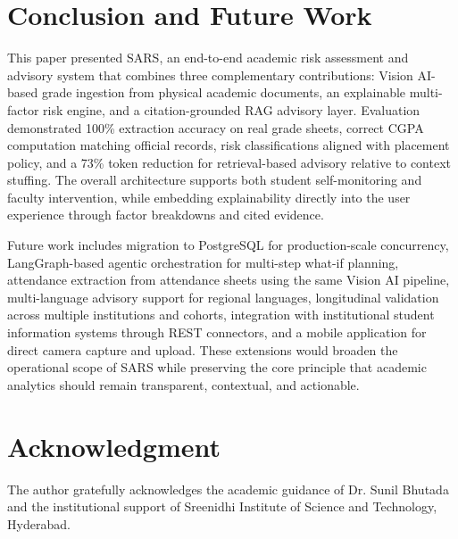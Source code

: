 \documentclass[conference]{IEEEtran}
\begin{document}
\section{Conclusion and Future Work}
This paper presented SARS, an end-to-end academic risk assessment and advisory system that combines three complementary contributions: Vision AI-based grade ingestion from physical academic documents, an explainable multi-factor risk engine, and a citation-grounded RAG advisory layer. Evaluation demonstrated 100\% extraction accuracy on real grade sheets, correct CGPA computation matching official records, risk classifications aligned with placement policy, and a 73\% token reduction for retrieval-based advisory relative to context stuffing. The overall architecture supports both student self-monitoring and faculty intervention, while embedding explainability directly into the user experience through factor breakdowns and cited evidence.

Future work includes migration to PostgreSQL for production-scale concurrency, LangGraph-based agentic orchestration for multi-step what-if planning, attendance extraction from attendance sheets using the same Vision AI pipeline, multi-language advisory support for regional languages, longitudinal validation across multiple institutions and cohorts, integration with institutional student information systems through REST connectors, and a mobile application for direct camera capture and upload. These extensions would broaden the operational scope of SARS while preserving the core principle that academic analytics should remain transparent, contextual, and actionable.

\section*{Acknowledgment}
The author gratefully acknowledges the academic guidance of Dr. Sunil Bhutada and the institutional support of Sreenidhi Institute of Science and Technology, Hyderabad.
\end{document}

